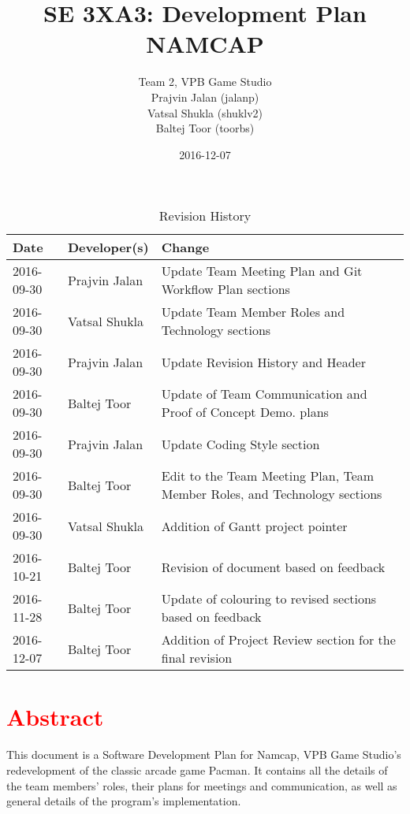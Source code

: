 \documentclass{article}
\title{SE 3XA3: Development Plan\\NAMCAP}
\author{Team 2, VPB Game Studio
		\\ Prajvin Jalan (jalanp)
		\\ Vatsal Shukla (shuklv2)
		\\ Baltej Toor (toorbs)
}
\date{2016-12-07}
\begin{document}
\begin{table}[hp]
\caption{Revision History} \label{TblRevisionHistory}
\begin{tabularx}{\textwidth}{llX}
\toprule
\textbf{Date} & \textbf{Developer(s)} & \textbf{Change}\\
\midrule
2016-09-30 & Prajvin Jalan & Update Team Meeting Plan and Git Workflow Plan sections\\
2016-09-30 & Vatsal Shukla & Update Team Member Roles and Technology sections \\
2016-09-30 & Prajvin Jalan & Update Revision History and Header\\
2016-09-30 & Baltej Toor & Update of Team Communication and Proof of Concept Demo. plans\\
2016-09-30 & Prajvin Jalan & Update Coding Style section\\
2016-09-30 & Baltej Toor & Edit to the Team Meeting Plan, Team Member Roles, and Technology sections\\ 
2016-09-30 & Vatsal Shukla & Addition of Gantt project pointer\\
2016-10-21 & Baltej Toor & Revision of document based on feedback\\
2016-11-28 & Baltej Toor & Update of colouring to revised sections based on feedback\\
2016-12-07 & Baltej Toor & Addition of Project Review section for the final revision\\
\bottomrule
\end{tabularx}
\end{table}

\newpage

\maketitle

\section*{\hfil \textcolor{red}{Abstract} \hfil}
This document is a Software Development Plan for Namcap, VPB Game Studio's redevelopment of the classic arcade game Pacman. It contains all the details of the team members' roles, their plans for meetings and communication, as well as general details of the program's implementation.
\end{document}
